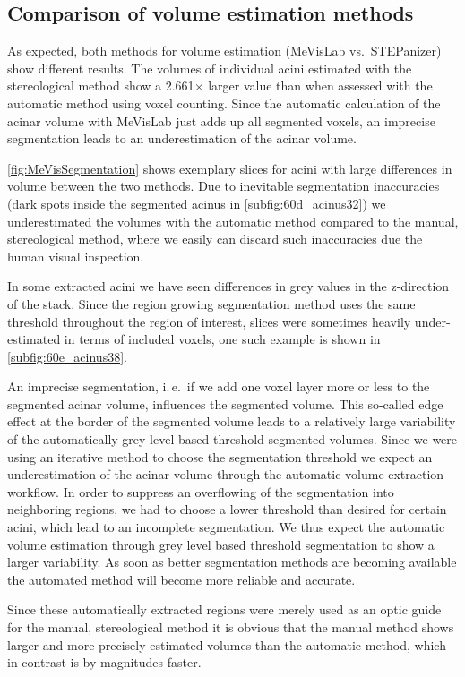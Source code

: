 \documentclass[a4paper,DIV=calc,abstract,english]{scrartcl}
\newcommand{\ie}{i.\,e.\ }
\newcommand{\difference}{2.661} %
\begin{document}
\subsection{Comparison of volume estimation methods}
As expected, both methods for volume estimation (MeVisLab vs.\ STEPanizer) show different results.
The volumes of individual acini estimated with the stereological method show a \difference\(\times\) larger value than when assessed with the automatic method using voxel counting.
Since the automatic calculation of the acinar volume with MeVisLab just adds up all segmented voxels, an imprecise segmentation leads to an underestimation of the acinar volume.

\autoref{fig:MeVisSegmentation} shows exemplary slices for acini with large differences in volume between the two methods.
Due to inevitable segmentation inaccuracies (dark spots inside the segmented acinus in \autoref{subfig:60d_acinus32}) we underestimated the volumes with the automatic method compared to the manual, stereological method, where we easily can discard such inaccuracies due the human visual inspection.

In some extracted acini we have seen differences in grey values in the z-direction of the stack.
Since the region growing segmentation method uses the same threshold throughout the region of interest, slices were sometimes heavily under-estimated in terms of included voxels, one such example is shown in \autoref{subfig:60e_acinus38}.

An imprecise segmentation, \ie if we add one voxel layer more or less to the segmented acinar volume, influences the segmented volume.
This so-called edge effect at the border of the segmented volume leads to a relatively large variability of the automatically grey level based threshold segmented volumes.
Since we were using an iterative method to choose the segmentation threshold we expect an underestimation of the acinar volume through the automatic volume extraction workflow.
In order to suppress an overflowing of the segmentation into neighboring regions, we had to choose a lower threshold than desired for certain acini, which lead to an incomplete segmentation.
We thus expect the automatic volume estimation through grey level based threshold segmentation to show a larger variability.
As soon as better segmentation methods are becoming available the automated method will become more reliable and accurate.

Since these automatically extracted regions were merely used as an optic guide for the manual, stereological method it is obvious that the manual method shows larger and more precisely estimated volumes than the automatic method, which in contrast is by magnitudes faster.
\end{document}
